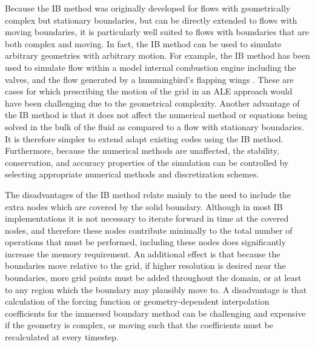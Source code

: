 \documentclass{article}
\begin{document}
Because the IB method was originally developed for flows with geometrically complex but stationary boundaries, but can be directly extended to flows with moving boundaries, it is particularly well suited to flows with boundaries that are both complex and moving. In fact, the IB method can be used to simulate arbitrary geometries with arbitrary motion. For example, the IB method has been used to simulate flow within a model internal combustion engine including the valves, \cite{fadlun2000combined} and the flow generated by a hummingbird's flapping wings \cite{song2014three}. These are cases for which prescribing the motion of the grid in an ALE approach would have been challenging due to the geometrical complexity. Another advantage of the IB method is that it does not affect the numerical method or equations being solved in the bulk of the fluid as compared to a flow with stationary boundaries. It is therefore simpler to extend adapt existing codes using the IB method. Furthermore, because the numerical methods are unaffected, the stability, conservation, and accuracy properties of the simulation can be controlled by selecting appropriate numerical methods and discretization schemes.  

The disadvantages of the IB method relate mainly to the need to include the extra nodes which are covered by the solid boundary. Although in most IB implementations it is not necessary to iterate forward in time at the covered nodes, and therefore these nodes contribute minimally to the total number of operations that must be performed, including these nodes does significantly increase the memory requirement. An additional effect is that because the boundaries move relative to the grid, if higher resolution is desired near the boundaries, more grid points must be added throughout the domain, or at least to any region which the boundary may plausibly move to. A disadvantage is that calculation of the forcing function or geometry-dependent interpolation coefficients for the immersed boundary method can be challenging and expensive if the geometry is complex, or moving such that the coefficients must be recalculated at every timestep. 

\end{document}
